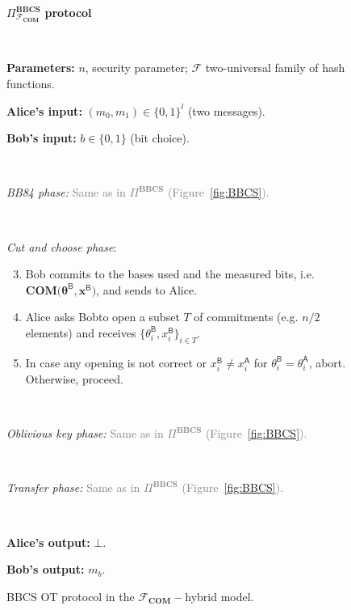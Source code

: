\begin{figure}[h!]
\centering
\begin{tcolorbox}
                        
    \centerline{$\Pi^{\textbf{BBCS}}_{\mathcal{F}_{\textbf{COM}}}$ \textbf{protocol}}
            
    \
    
    \textbf{Parameters:} $n$, security parameter; $\mathcal{F}$ two-universal family of hash functions.
    
    \textbf{Alice's input:} $(m_0, m_1)\in\{0,1\}^l$ (two messages). 
    
    \textbf{Bob's input:} $b\in\{0,1\}$ (bit choice).
    
    \
    
    \textit{BB84 phase:} \textcolor{gray}{Same as in $\Pi^{\textbf{BBCS}}$ (Figure~\ref{fig:BBCS}).}
    
    
    \
    
    \textit{Cut and choose phase}:
    \begin{enumerate}
    \setcounter{enumi}{2}
        \item Bob commits to the bases used and the measured bits, i.e. $\textbf{COM}\big(\bm{\theta}^\mathsf{B}, \bm{x}^\mathsf{B}\big)$, and sends to Alice. %
        \item Alice asks Bobto open a subset $T$ of commitments (e.g. $n/2$ elements) and receives $\{\theta_i^\mathsf{B}, x_i^\mathsf{B}\}_{i\in T}$.%
        \item In case any opening is not correct or $x_i^\mathsf{B} \neq x_i^\mathsf{A}$ for $\theta_i^\mathsf{B} = \theta_i^\mathsf{A}$, abort. Otherwise, proceed. 
    \end{enumerate}
    
    \
    
    \textit{Oblivious key phase:} \textcolor{gray}{Same as in $\Pi^{\textbf{BBCS}}$ (Figure~\ref{fig:BBCS}).}
     
    \
     
    \textit{Transfer phase:} \textcolor{gray}{Same as in $\Pi^{\textbf{BBCS}}$ (Figure~\ref{fig:BBCS}).}
    
    \
    
\textbf{Alice's output:} $\bot$.

\textbf{Bob's output:} $m_b$.
    
\end{tcolorbox} 
    \caption{BBCS OT protocol in the $\mathcal{F}_{\textbf{COM}}-$hybrid model.}
    \label{fig:BBCS_COM}
\end{figure}


